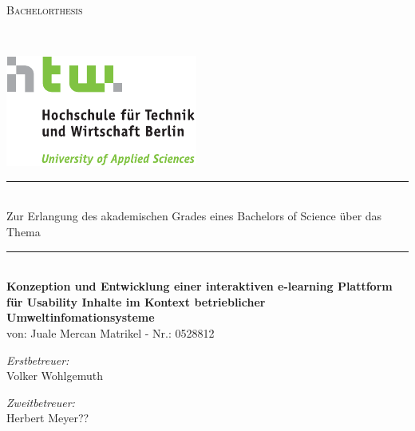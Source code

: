 \newcommand{\HRule}{\rule{\linewidth}{0.0mm}}
\thispagestyle{empty}
\begin{titlepage}
\begin{center}
\textsc{\LARGE Bachelorthesis}\\[0.5cm]
%
\begin{minipage}[t]{\textwidth}
\end{minipage}\\[0.8cm]

\begin{minipage}[c]{0.2\textwidth}

\includegraphics[viewport=0 0 60 60]{HTW_Logo_4c.pdf}

\end{minipage}

\HRule \\[0.2cm]
\large {Zur Erlangung des akademischen Grades eines \linebreak Bachelors of Science \linebreak über das Thema}
%

\HRule \\[0.25 cm]
{ \LARGE \bfseries Konzeption und Entwicklung einer \linebreak interaktiven e-learning
Plattform \linebreak für Usability Inhalte im Kontext \linebreak betrieblicher
Umweltinfomationsysteme}\\[1.5 cm]%

% 

{von: Juale Mercan \linebreak \small Matrikel - Nr.: 0528812}\\[1.0cm]

\begin{minipage}{0.4\textwidth}
\begin{flushleft} \normalsize
\emph{Erstbetreuer:}\\ Volker Wohlgemuth
\end{flushleft}
\end{minipage}
\begin{minipage}{0.4\textwidth}
\begin{flushright} \normalsize
\emph{Zweitbetreuer:}\\ Herbert Meyer?? 


\end{flushright}
\end{minipage}
\end{center}
\end{titlepage}
